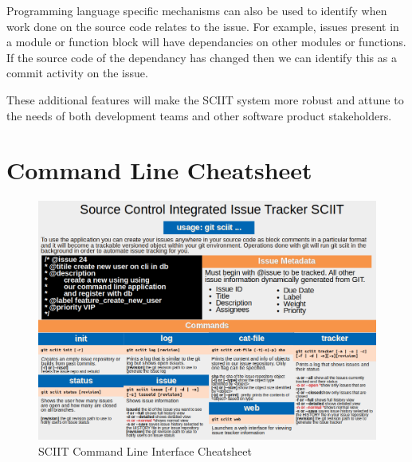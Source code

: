 \documentclass{mproj}
\begin{document}
Programming language specific mechanisms can also be used to identify when work done on the source code relates to the issue. For example, issues present in a module or function block will have dependancies on other modules or functions. If the source code of the dependancy has changed then we can identify this as a commit activity on the issue.

These additional features will make the SCIIT system more robust and attune to the needs of both development teams and other software product stakeholders.


\appendix %
\chapter{Command Line Cheatsheet}
\begin{figure}[h!]
\caption{SCIIT Command Line Interface Cheatsheet}
\label{fig:sciit-cheatsheet}
\centering
\includegraphics[width=16cm]{Cheatsheet}
\end{figure}




\end{document}
